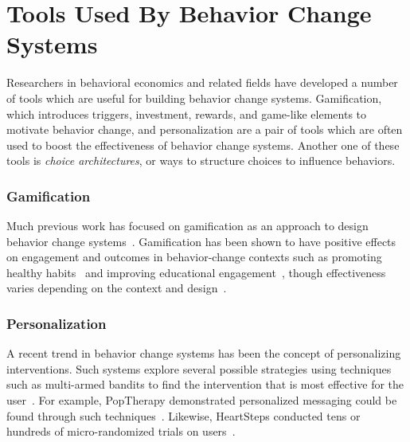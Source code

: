 \section{Tools Used By Behavior Change Systems}

Researchers in behavioral economics and related fields have developed a number of tools which are useful for building behavior change systems. Gamification, which introduces triggers, investment, rewards, and game-like elements to motivate behavior change, and personalization are a pair of tools which are often used to boost the effectiveness of behavior change systems. Another one of these tools is \textit{choice architectures}, or ways to structure choices to influence behaviors.

\subsubsection{Gamification}

Much previous work has focused on gamification as an approach to design behavior change systems~\cite{deterding2011game}. Gamification has been shown to have positive effects on engagement and outcomes in behavior-change contexts such as promoting healthy habits~\cite{cugelman2013gamification, lyons2014behavior} and improving  educational engagement~\cite{anderson2013steering, anderson2014engaging}, though effectiveness varies depending on the context and design~\cite{6758978}. %


\subsubsection{Personalization}

A recent trend in behavior change systems has been the concept of personalizing interventions. Such systems explore several possible strategies using techniques such as multi-armed bandits to find the intervention that is most effective for the user~\cite{paredes2014poptherapy, rabbi2014automated}. For example, PopTherapy demonstrated personalized messaging could be found through such techniques~\cite{paredes2014poptherapy}. Likewise, HeartSteps conducted tens or hundreds of micro-randomized trials on users~\cite{doi:10.1111/j.1740-9713.2015.00863.x}.  %


